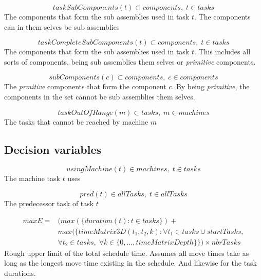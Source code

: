 \documentclass[10pt,a4paper]{report}
\begin{document}
\begin{equation}\label{eq:53}
taskSubComponents(t) \subset components, \; t \in tasks\end{equation}
The components that form the sub assemblies used in task $t$. The components can in them selves be sub assemblies

\begin{equation}\label{eq:54}
taskCompleteSubComponents(t) \subset components, \; t \in tasks\end{equation}
The components that form the sub assemblies used in task $t$. This includes all sorts of components, being sub assemblies them selves or \emph{primitive} components.

\begin{equation}\label{eq:55}
subComponents(c) \subset components, \; c \in components\end{equation}
The \emph{prmitive} components that form the component $c$. By being \emph{primitive}, the components in the set cannot be sub assemblies them selves.

\begin{equation}\label{eq:56}
taskOutOfRange(m) \subset tasks, \; m \in machines\end{equation}
The tasks that cannot be reached by machine $m$


\subsection*{Decision variables}

\begin{equation}\label{eq:40}
usingMachine(t) \in machines, \; t \in tasks\end{equation}
The machine task $t$ uses

\begin{equation}\label{eq:41}
pred(t) \in allTasks, \; t \in allTasks\end{equation}
The predecessor task of task $t$

\begin{equation}
\begin{aligned}\label{eq:45}
maxE = &(max(\{duration(t) : t \in tasks\}) +  \\ 
&max(\{timeMatrix3D(t_1,t_2,k) : \forall t_1 \in tasks \cup startTasks,  \\ 
&\forall t_2 \in tasks, \; \forall k \in \{0 , \ldots , timeMatrixDepth\}\}) \times nbrTasks
\end{aligned}
\end{equation}
Rough upper limit of the total schedule time. Assumes all move times take as long as the longest move time existing in the schedule. And likewise for the task durations.
\end{document}

